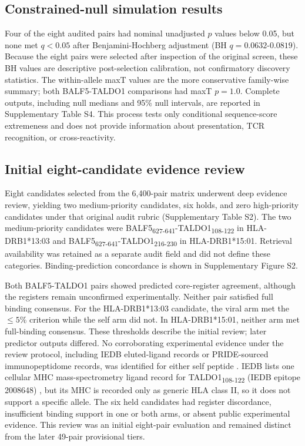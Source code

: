 \documentclass[11pt]{article}
\newcommand{\pep}[2]{#1\textsubscript{#2}}
\begin{document}
\subsection{Constrained-null simulation results}
Four of the eight audited pairs had nominal unadjusted $p$ values below 0.05, but none met $q<0.05$ after Benjamini-Hochberg adjustment (BH $q=0.0632$-$0.0819$). Because the eight pairs were selected after inspection of the original screen, these BH values are descriptive post-selection calibration, not confirmatory discovery statistics. The within-allele maxT values are the more conservative family-wise summary; both BALF5-TALDO1 comparisons had maxT $p=1.0$. Complete outputs, including null medians and 95\% null intervals, are reported in Supplementary Table S4. This process tests only conditional sequence-score extremeness and does not provide information about presentation, TCR recognition, or cross-reactivity.

\subsection{Initial eight-candidate evidence review}
Eight candidates selected from the 6,400-pair matrix underwent deep evidence review, yielding two medium-priority candidates, six holds, and zero high-priority candidates under that original audit rubric (Supplementary Table S2). The two medium-priority candidates were \pep{BALF5}{627-641}-\pep{TALDO1}{108-122} in HLA-DRB1*13:03 and \pep{BALF5}{627-641}-\pep{TALDO1}{216-230} in HLA-DRB1*15:01. Retrieval availability was retained as a separate audit field and did not define these categories. Binding-prediction concordance is shown in Supplementary Figure S2.

Both BALF5-TALDO1 pairs showed predicted core-register agreement, although the registers remain unconfirmed experimentally. Neither pair satisfied full binding consensus. For the HLA-DRB1*13:03 candidate, the viral arm met the $\leq5\%$ criterion while the self arm did not. In HLA-DRB1*15:01, neither arm met full-binding consensus. These thresholds describe the initial review; later predictor outputs differed. No corroborating experimental evidence under the review protocol, including IEDB eluted-ligand records or PRIDE-sourced immunopeptidome records, was identified for either self peptide \cite{pride}. IEDB lists one cellular MHC mass-spectrometry ligand record for \pep{TALDO1}{108-122} (IEDB epitope 2008648) \cite{iedb}, but its MHC is recorded only as generic HLA class II, so it does not support a specific allele. The six held candidates had register discordance, insufficient binding support in one or both arms, or absent public experimental evidence. This review was an initial eight-pair evaluation and remained distinct from the later 49-pair provisional tiers.
\end{document}
